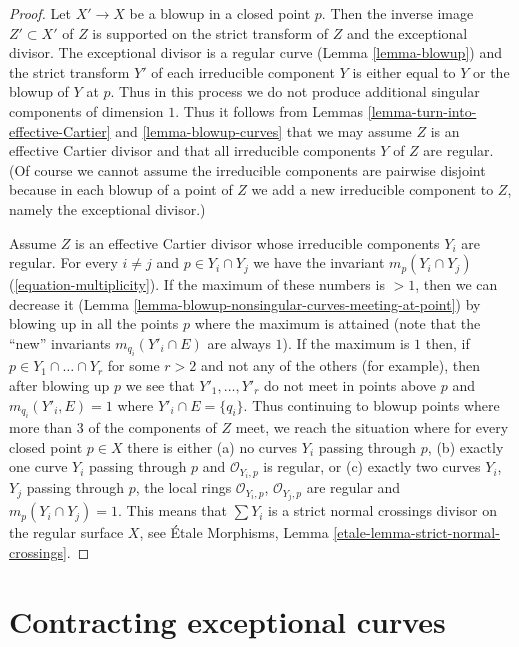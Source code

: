 \begin{proof}
Let $X' \to X$ be a blowup in a closed point $p$. Then the inverse image
$Z' \subset X'$ of $Z$ is supported on the strict transform of $Z$ and
the exceptional divisor. The exceptional divisor is a regular curve
(Lemma \ref{lemma-blowup}) and the strict transform $Y'$ of each irreducible
component $Y$ is either equal to $Y$ or the blowup of $Y$ at $p$.
Thus in this process we do not produce additional singular components
of dimension $1$. Thus it follows from
Lemmas \ref{lemma-turn-into-effective-Cartier} and \ref{lemma-blowup-curves}
that we may assume $Z$ is an effective Cartier divisor and
that all irreducible components $Y$ of $Z$ are regular.
(Of course we cannot assume the irreducible components are
pairwise disjoint because in each blowup of a point of $Z$
we add a new irreducible component to $Z$, namely the exceptional divisor.)

\medskip\noindent
Assume $Z$ is an effective Cartier divisor whose irreducible components
$Y_i$ are regular. For every $i \not = j$
and $p \in Y_i \cap Y_j$ we have the invariant
$m_p(Y_i \cap Y_j)$ (\ref{equation-multiplicity}).
If the maximum of these numbers is $> 1$, then we can decrease
it (Lemma \ref{lemma-blowup-nonsingular-curves-meeting-at-point})
by blowing up in all the points $p$ where the maximum is attained
(note that the ``new'' invariants $m_{q_i}(Y'_i \cap E)$ are always $1$).
If the maximum is $1$ then, if $p \in Y_1 \cap \ldots \cap Y_r$
for some $r > 2$ and not any of the others (for example), then after
blowing up $p$ we see that $Y'_1, \ldots, Y'_r$ do not meet in points
above $p$ and $m_{q_i}(Y'_i, E) = 1$ where $Y'_i \cap E = \{q_i\}$.
Thus continuing to blowup points where more than $3$
of the components of $Z$ meet, we reach the situation where
for every closed point $p \in X$ there is either
(a) no curves $Y_i$ passing through $p$,
(b) exactly one curve $Y_i$ passing through $p$ and $\mathcal{O}_{Y_i, p}$
is regular, or (c) exactly two curves $Y_i$, $Y_j$ passing through
$p$, the local rings $\mathcal{O}_{Y_i, p}$, $\mathcal{O}_{Y_j, p}$
are regular and $m_p(Y_i \cap Y_j) = 1$.
This means that $\sum Y_i$ is a strict normal crossings
divisor on the regular surface $X$, see
\'Etale Morphisms, Lemma
\ref{etale-lemma-strict-normal-crossings}.
\end{proof}






\section{Contracting exceptional curves}
\label{section-minus-one}

